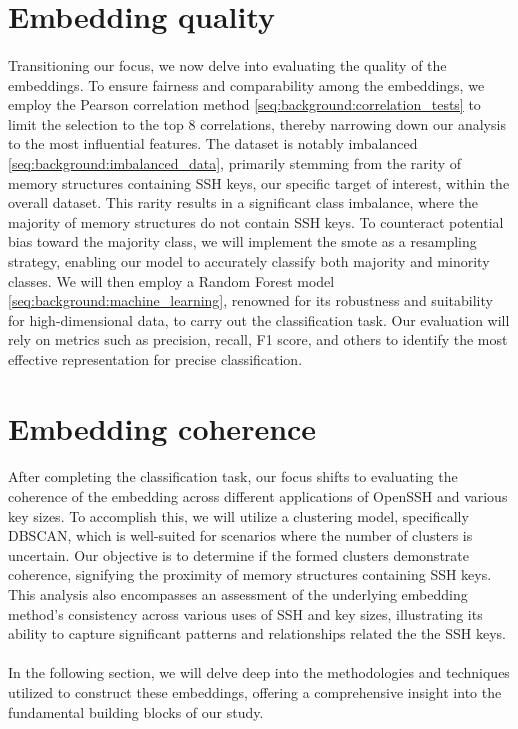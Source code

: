     \section{Embedding quality}
        \paragraph{} Transitioning our focus, we now delve into evaluating the quality of the embeddings. To ensure fairness and comparability among the embeddings, we employ the Pearson correlation method \ref{seq:background:correlation_tests} to limit the selection to the top 8 correlations, thereby narrowing down our analysis to the most influential features. The dataset is notably imbalanced \ref{seq:background:imbalanced_data}, primarily stemming from the rarity of memory structures containing SSH keys, our specific target of interest, within the overall dataset. This rarity results in a significant class imbalance, where the majority of memory structures do not contain SSH keys. To counteract potential bias toward the majority class, we will implement the \acrfull{smote} as a resampling strategy, enabling our model to accurately classify both majority and minority classes. We will then employ a Random Forest model \ref{seq:background:machine_learning}, renowned for its robustness and suitability for high-dimensional data, to carry out the classification task. Our evaluation will rely on metrics such as precision, recall, F1 score, and others to identify the most effective representation for precise classification.

    \section{Embedding coherence}
        \paragraph{}After completing the classification task, our focus shifts to evaluating the coherence of the embedding across different applications of OpenSSH and various key sizes. To accomplish this, we will utilize a clustering model, specifically DBSCAN, which is well-suited for scenarios where the number of clusters is uncertain. Our objective is to determine if the formed clusters demonstrate coherence, signifying the proximity of memory structures containing SSH keys. This analysis also encompasses an assessment of the underlying embedding method's consistency across various uses of SSH and key sizes, illustrating its ability to capture significant patterns and relationships related the the SSH keys.

        \paragraph{}In the following section, we will delve deep into the methodologies and techniques utilized to construct these embeddings, offering a comprehensive insight into the fundamental building blocks of our study.